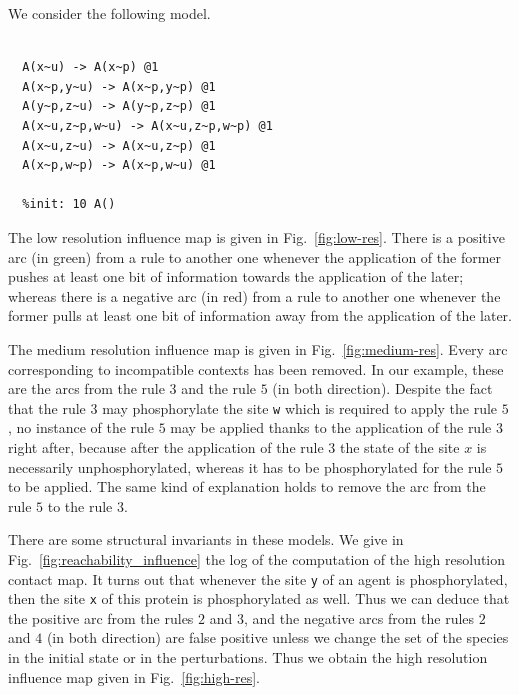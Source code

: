 \documentclass[11pt]{book}
\begin{document}
We consider the following model.
\begin{lstlisting}[language=kappa]
  %agent: A(w~u~p,x~u~p,y~u~p,z~u~p)

  A(x~u) -> A(x~p) @1
  A(x~p,y~u) -> A(x~p,y~p) @1
  A(y~p,z~u) -> A(y~p,z~p) @1
  A(x~u,z~p,w~u) -> A(x~u,z~p,w~p) @1
  A(x~u,z~u) -> A(x~u,z~p) @1
  A(x~p,w~p) -> A(x~p,w~u) @1

  %init: 10 A()
\end{lstlisting}

The low resolution influence map is given in Fig.~\ref{fig:low-res}.
There is a positive arc (in green) from a rule to another one whenever the application of the former pushes at least one bit of information towards the application of the later; whereas there is a negative arc (in red) from a rule to another one whenever the former pulls at least one bit of information away from the application of the later.

The medium resolution influence map is given in Fig.~\ref{fig:medium-res}.
Every arc corresponding to incompatible contexts has been removed.
In our example, these are the arcs from the rule $3$ and the rule $5$ (in both direction). Despite the fact that the rule $3$ may phosphorylate the site \texttt{w} which is required to apply the rule $5$, no instance of the rule $5$ may be applied thanks to the application of the rule $3$ right after, because after the application of the rule $3$ the state of the site $x$ is necessarily unphosphorylated, whereas it has to be phosphorylated for the rule $5$ to be applied. The same kind of explanation holds to remove the arc from the rule $5$ to the rule $3$.

There are some structural invariants in these models. We give in Fig.~\ref{fig:reachability_influence} the log of the computation of the high resolution contact map. It turns out that whenever the site \texttt{y} of an agent is phosphorylated, then the site \texttt{x} of this protein is phosphorylated as well. Thus we can deduce that the positive arc from the rules $2$ and $3$, and the negative arcs from the rules $2$ and $4$ (in both direction) are false positive unless we change the set of the species in the initial state or in the perturbations. Thus we obtain the high resolution influence map given in Fig.~\ref{fig:high-res}.
\end{document}
